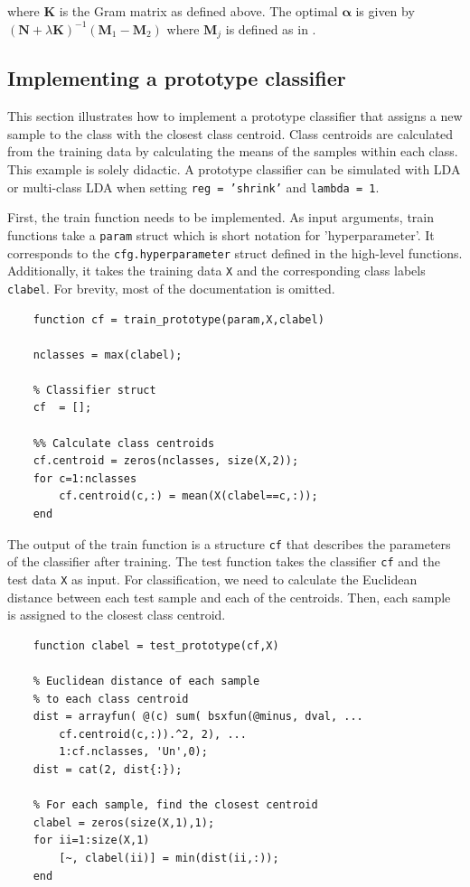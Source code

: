 \documentclass[utf8]{frontiersSCNS} %
\newcommand{\al}{\boldsymbol{\alpha}}
\newcommand{\K}{\mathbf{K}}
\newcommand{\M}{\mathbf{M}}
\newcommand{\ttt}[1]{\texttt{#1}}
\begin{document}
where $\K$ is the Gram matrix as defined above. The optimal $\al$ is given by $(\mathbf{N} + \lambda\K)^{-1}(\M_1 - \M_2)$ where $\M_j$ is defined as in .


\subsection{Implementing a prototype classifier}

This section illustrates how to implement a prototype classifier that assigns a new sample to the class with the closest class centroid. Class centroids are calculated from the training data by calculating the means of the samples within each class. This example is solely didactic. A prototype classifier can be simulated with LDA or multi-class LDA when setting \ttt{reg = 'shrink'} and \ttt{lambda = 1}.

First, the train function needs to be implemented. As input arguments, train functions take a \ttt{param} struct which is short notation for 'hyperparameter'. It corresponds to the \ttt{cfg.hyperparameter} struct defined in the high-level functions. Additionally, it takes the training data \ttt{X} and the corresponding class labels \ttt{clabel}. For brevity, most of the documentation is omitted.

\begin{verbatim}
    function cf = train_prototype(param,X,clabel)

    nclasses = max(clabel);

    % Classifier struct
    cf  = [];

    %% Calculate class centroids
    cf.centroid = zeros(nclasses, size(X,2));
    for c=1:nclasses
        cf.centroid(c,:) = mean(X(clabel==c,:));
    end
\end{verbatim}

The output of the train function is a structure \ttt{cf} that describes the parameters of the classifier after training. The test function takes the classifier \ttt{cf} and the test data \ttt{X} as input. For classification, we need to calculate the Euclidean distance between each test sample and each of the centroids. Then, each sample is assigned to the closest class centroid.

\begin{verbatim}
    function clabel = test_prototype(cf,X)

    % Euclidean distance of each sample 
    % to each class centroid
    dist = arrayfun( @(c) sum( bsxfun(@minus, dval, ...
        cf.centroid(c,:)).^2, 2), ...
        1:cf.nclasses, 'Un',0);
    dist = cat(2, dist{:});

    % For each sample, find the closest centroid
    clabel = zeros(size(X,1),1);
    for ii=1:size(X,1)
        [~, clabel(ii)] = min(dist(ii,:));
    end

\end{verbatim}
\end{document}
